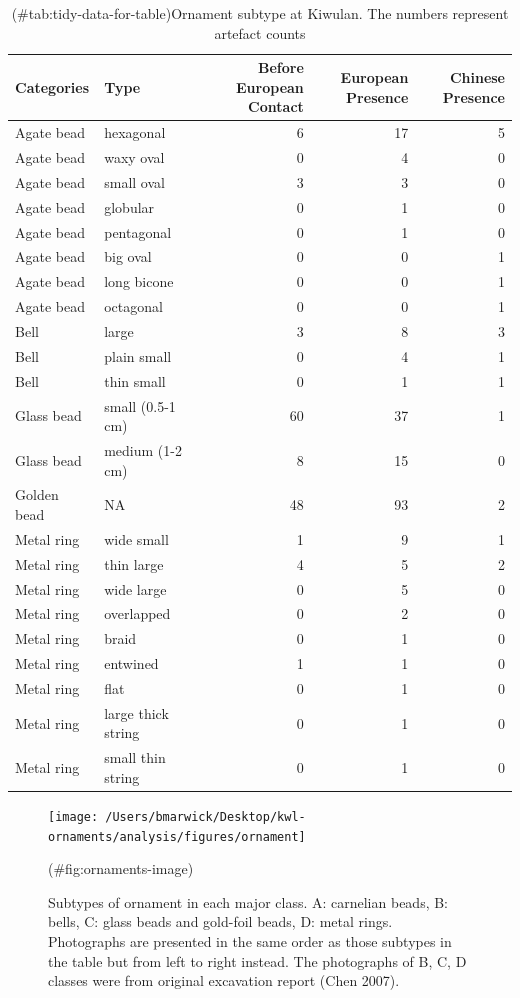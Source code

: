 \documentclass[]{article}
\begin{document}
\begin{table}

\caption{(\#tab:tidy-data-for-table)Ornament subtype at Kiwulan. The numbers represent artefact counts }
\centering
\begin{tabular}[t]{l|l|r|r|r}
\hline
Categories & Type & Before European Contact & European Presence & Chinese Presence\\
\hline
Agate bead & hexagonal & 6 & 17 & 5\\
\hline
Agate bead & waxy oval & 0 & 4 & 0\\
\hline
Agate bead & small oval & 3 & 3 & 0\\
\hline
Agate bead & globular & 0 & 1 & 0\\
\hline
Agate bead & pentagonal & 0 & 1 & 0\\
\hline
Agate bead & big oval & 0 & 0 & 1\\
\hline
Agate bead & long bicone & 0 & 0 & 1\\
\hline
Agate bead & octagonal & 0 & 0 & 1\\
\hline
Bell & large & 3 & 8 & 3\\
\hline
Bell & plain small & 0 & 4 & 1\\
\hline
Bell & thin small & 0 & 1 & 1\\
\hline
Glass bead & small (0.5-1 cm) & 60 & 37 & 1\\
\hline
Glass bead & medium (1-2 cm) & 8 & 15 & 0\\
\hline
Golden bead & NA & 48 & 93 & 2\\
\hline
Metal ring & wide small & 1 & 9 & 1\\
\hline
Metal ring & thin large & 4 & 5 & 2\\
\hline
Metal ring & wide large & 0 & 5 & 0\\
\hline
Metal ring & overlapped & 0 & 2 & 0\\
\hline
Metal ring & braid & 0 & 1 & 0\\
\hline
Metal ring & entwined & 1 & 1 & 0\\
\hline
Metal ring & flat & 0 & 1 & 0\\
\hline
Metal ring & large thick string & 0 & 1 & 0\\
\hline
Metal ring & small thin string & 0 & 1 & 0\\
\hline
\end{tabular}
\end{table}

\begin{figure}
\texttt{[image: /Users/bmarwick/Desktop/kwl-ornaments/analysis/figures/ornament]} \caption{Subtypes of ornament in each major class. A: carnelian beads, B: bells, C: glass beads and gold-foil beads, D: metal rings. Photographs are presented in the same order as those subtypes in the table but from left to right instead. The photographs of B, C, D classes were from original excavation report (Chen 2007).}(\#fig:ornaments-image)
\end{figure}
\end{document}
